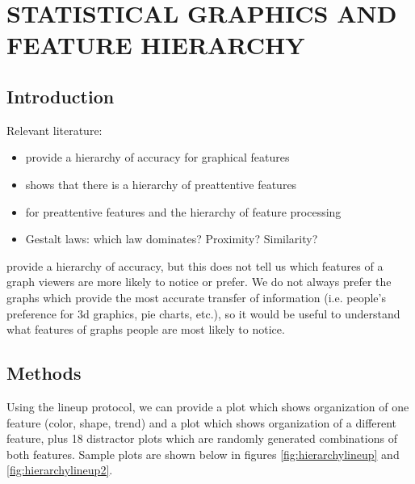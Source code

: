 \documentclass[11pt]{isuthesis}\usepackage[]{graphicx}\usepackage[]{color}
\begin{document}
\chapter{STATISTICAL GRAPHICS AND FEATURE HIERARCHY}\label{featurehierarchy}


\graphicspath{{Figure/FeatureHierarchy/}{Images/FeatureHierarchy/}}
\renewcommand{\floatpagefraction}{.99}




\section{Introduction}
Relevant literature:
\begin{itemize}
\item \citet{cleveland:1984,cleveland:1985} provide a hierarchy of accuracy for graphical features
\item \citet{healey1996high} shows that there is a hierarchy of preattentive features
\item \citet{treisman1985preattentive} for preattentive features and the hierarchy of feature processing
\item Gestalt laws: which law dominates? Proximity? Similarity?
\end{itemize}

\citet{cleveland:1985} provide a hierarchy of accuracy, but this does not tell us which features of a graph viewers are more likely to notice or prefer. We do not always prefer the graphs which provide the most accurate transfer of information (i.e. people's preference for 3d graphics, pie charts, etc.), so it would be useful to understand what features of graphs people are most likely to notice. 

\section{Methods}
Using the lineup protocol, we can provide a plot which shows organization of one feature (color, shape, trend) and a plot which shows organization of a different feature, plus 18 distractor plots which are randomly generated combinations of both features. Sample plots are shown below in figures \ref{fig:hierarchylineup} and \ref{fig:hierarchylineup2}.
\end{document}
